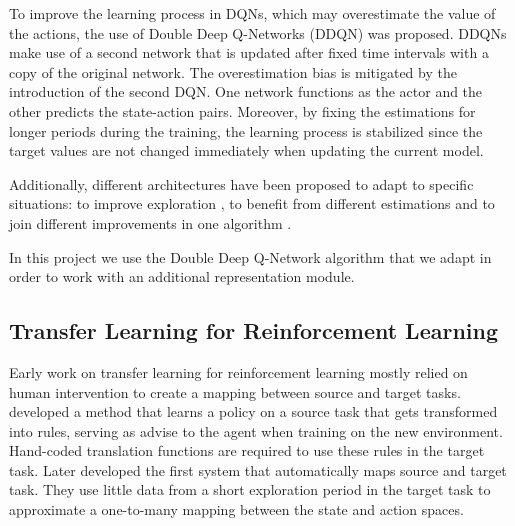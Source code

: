 To improve the learning process in DQNs, which may overestimate the value of the actions, the use of Double Deep Q-Networks (DDQN) \citep{DDQN} was proposed. DDQNs make use of a second network that is updated after fixed time intervals with a copy of the original network. The overestimation bias is mitigated by the introduction of the second DQN. One network functions as the actor and the other predicts the state-action pairs. Moreover, by fixing the estimations for longer periods during the training, the learning process is stabilized since the target values are not changed immediately when updating the current model.

Additionally, different architectures have been proposed to adapt to specific situations: to improve exploration \citep{noisy_dqn, hierarchical_dqn}, to benefit from different estimations \citep{DuelingDQN, distributional_dqn} and to join different improvements in one algorithm \citep{rainbow}. 

In this project we use the Double Deep Q-Network algorithm \citep{DDQN} that we adapt in order to work with an additional representation module. 

\subsection{Transfer Learning for Reinforcement Learning}
Early work on transfer learning for reinforcement learning mostly relied on human intervention to create a mapping between source and target tasks. \citet{taylor2007cross} developed a method that learns a policy on a source task that gets transformed into rules, serving as advise to the agent when training on the new environment. Hand-coded translation functions are required to use these rules in the target task.
Later \citet{taylor2008autonomous} developed the first system that automatically maps source and target task. 
They use little data from a short exploration period in the target task to approximate a one-to-many mapping between the state and action spaces.

